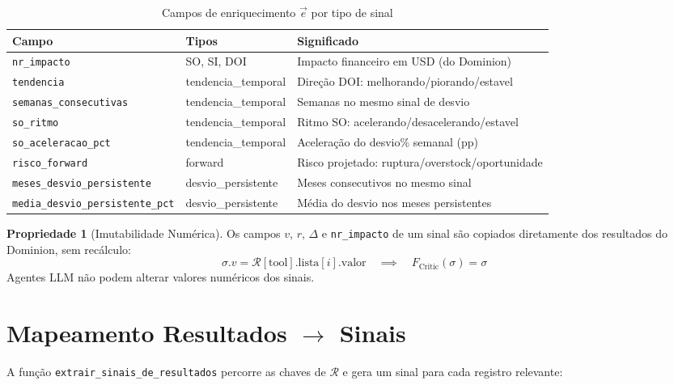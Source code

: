 \documentclass[a4paper, 12pt]{report}
\theoremstyle{definition}
\newtheorem{propriedade}{Propriedade}[chapter]
\theoremstyle{remark}
\begin{document}
\begin{table}[H]
\centering
\caption{Campos de enriquecimento $\vec{e}$ por tipo de sinal}
\label{tab:campos-enriquecimento}
\begin{tabular}{llp{6cm}}
  \toprule
  \textbf{Campo} & \textbf{Tipos} & \textbf{Significado} \\
  \midrule
  \texttt{nr\_impacto} & SO, SI, DOI & Impacto financeiro em USD (do Dominion) \\
  \texttt{tendencia} & tendencia\_temporal & Dire\c{c}\~ao DOI: melhorando/piorando/estavel \\
  \texttt{semanas\_consecutivas} & tendencia\_temporal & Semanas no mesmo sinal de desvio \\
  \texttt{so\_ritmo} & tendencia\_temporal & Ritmo SO: acelerando/desacelerando/estavel \\
  \texttt{so\_aceleracao\_pct} & tendencia\_temporal & Acelera\c{c}\~ao do desvio\% semanal (pp) \\
  \texttt{risco\_forward} & forward & Risco projetado: ruptura/overstock/oportunidade \\
  \texttt{meses\_desvio\_persistente} & desvio\_persistente & Meses consecutivos no mesmo sinal \\
  \texttt{media\_desvio\_persistente\_pct} & desvio\_persistente & M\'edia do desvio nos meses persistentes \\
  \bottomrule
\end{tabular}
\end{table}

\begin{propriedade}[Imutabilidade Num\'erica]
  Os campos $v$, $r$, $\Delta$ e \texttt{nr\_impacto} de um sinal s\~ao
  copiados diretamente dos resultados do Dominion, sem rec\'alculo:
  \[
    \sigma.v = \mathcal{R}[\text{tool}].\text{lista}[i].\text{valor}
    \quad \implies \quad
    F_{\text{Critic}}(\sigma) = \sigma
  \]
  Agentes LLM n\~ao podem alterar valores num\'ericos dos sinais.
\end{propriedade}


\section{Mapeamento Resultados $\to$ Sinais}

A fun\c{c}\~ao \texttt{extrair\_sinais\_de\_resultados} percorre as chaves
de $\mathcal{R}$ e gera um sinal para cada registro relevante:
\end{document}
